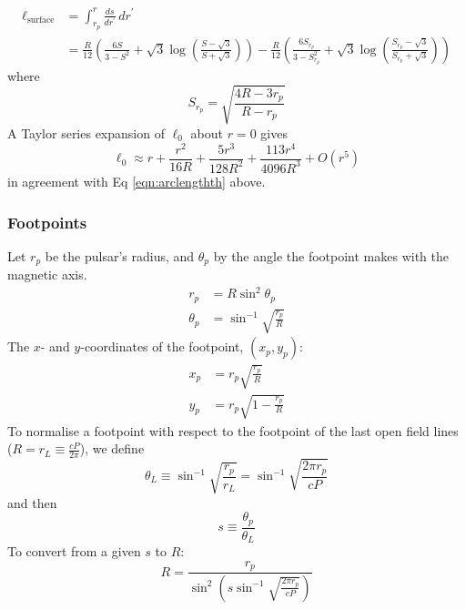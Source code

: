 \documentclass{article}
\newcommand{\deriv}[2]{\frac{d{#1}}{d{#2}}}
\begin{document}
\begin{equation}
    \begin{aligned}
        \ell_\text{surface} &= \int_{r_p}^r \deriv{s}{r^\prime} \,dr^\prime \\
               &= \frac{R}{12}\left(\frac{6S}{3 - S^2} + \sqrt{3}\log\left(\frac{S - \sqrt{3}}{S + \sqrt{3}}\right)\right) -
                  \frac{R}{12}\left(\frac{6S_{r_p}}{3 - S_{r_p}^2} + \sqrt{3}\log\left(\frac{S_{r_p} -
                  \sqrt{3}}{S_{r_p} + \sqrt{3}}\right)\right)
     \end{aligned}
\end{equation}
where
\begin{equation}
    S_{r_p} = \sqrt{\frac{4R-3r_p}{R-r_p}}
\end{equation}
A Taylor series expansion of $\ell_0$ about $r=0$ gives
\begin{equation}
    \ell_0 \approx r + \frac{r^2}{16R} + \frac{5r^3}{128R^2} + \frac{113r^4}{4096R^3} + O(r^5)
\end{equation}
in agreement with Eq \eqref{eqn:arclengthth} above.

\subsubsection{Footpoints}

Let $r_p$ be the pulsar's radius, and $\theta_p$ by the angle the footpoint makes with the magnetic axis.
\begin{align}
    r_p &= R\sin^2\theta_p \\
    \theta_p &= \sin^{-1}\sqrt{\frac{r_p}{R}}
\end{align}
The $x$- and $y$-coordinates of the footpoint, $(x_p,y_p)$:
\begin{align}
    x_p &= r_p\sqrt{\frac{r_p}{R}} \\
    y_p &= r_p \sqrt{1 - \frac{r_p}{R}}
\end{align}
To normalise a footpoint with respect to the footpoint of the last open field lines ($R = r_L \equiv \frac{cP}{2\pi}$), we define
\begin{equation}
    \theta_L \equiv \sin^{-1}\sqrt{\frac{r_p}{r_L}}
             =      \sin^{-1}\sqrt{\frac{2\pi r_p}{cP}}
\end{equation}
and then
\begin{equation}
    s \equiv \frac{\theta_p}{\theta_L}
\end{equation}
To convert from a given $s$ to $R$:
\begin{equation}
    R = \frac{r_p}{\sin^2\left(s\sin^{-1}\sqrt{\frac{2\pi r_p}{cP}}\right)}
\end{equation}
\end{document}
